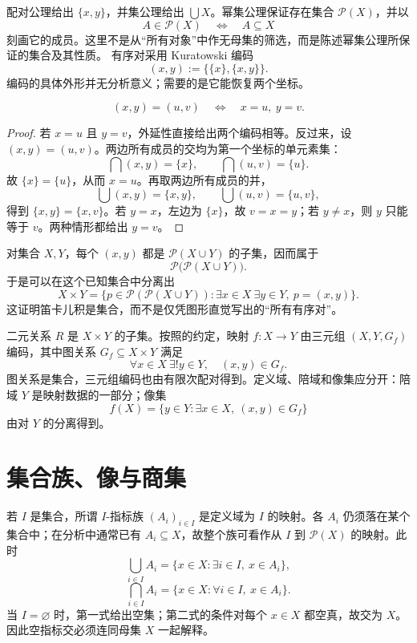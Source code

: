 配对公理给出 \(\{x,y\}\)，并集公理给出 \(\bigcup X\)。幂集公理保证存在集合 \(\mathcal P(X)\)，并以
\[
 A\in\mathcal P(X)\quad\Longleftrightarrow\quad A\subseteq X
\]
刻画它的成员。这里不是从“所有对象”中作无母集的筛选，而是陈述幂集公理所保证的集合及其性质。
有序对采用 Kuratowski 编码
\[
 (x,y):=\bigl\{\{x\},\{x,y\}\bigr\}.
\]
编码的具体外形并无分析意义；需要的是它能恢复两个坐标。

\begin{theorem}[有序对的坐标唯一性]
\[
 (x,y)=(u,v)\quad\Longleftrightarrow\quad x=u,\ y=v.
\]
\end{theorem}

\begin{proof}
若 \(x=u\) 且 \(y=v\)，外延性直接给出两个编码相等。反过来，设 \((x,y)=(u,v)\)。两边所有成员的交均为第一个坐标的单元素集：
\[
 \bigcap(x,y)=\{x\},\qquad \bigcap(u,v)=\{u\}.
\]
故 \(\{x\}=\{u\}\)，从而 \(x=u\)。再取两边所有成员的并，
\[
 \bigcup(x,y)=\{x,y\},\qquad
 \bigcup(u,v)=\{u,v\},
\]
得到 \(\{x,y\}=\{x,v\}\)。若 \(y=x\)，左边为 \(\{x\}\)，故 \(v=x=y\)；若 \(y\ne x\)，则 \(y\) 只能等于 \(v\)。两种情形都给出 \(y=v\)。
\end{proof}

对集合 \(X,Y\)，每个 \((x,y)\) 都是 \(\mathcal P(X\cup Y)\) 的子集，因而属于
\[
 \mathcal P\bigl(\mathcal P(X\cup Y)\bigr).
\]
于是可以在这个已知集合中分离出
\[
 X\times Y
 =
 \{p\in\mathcal P(\mathcal P(X\cup Y)):
   \exists x\in X\ \exists y\in Y,\ p=(x,y)\}.
\]
这证明笛卡儿积是集合，而不是仅凭图形直觉写出的“所有有序对”。

二元关系 \(R\) 是 \(X\times Y\) 的子集。按照的约定，映射 \(f:X\to Y\) 由三元组 \((X,Y,G_f)\) 编码，其中图关系 \(G_f\subseteq X\times Y\) 满足
\[
 \forall x\in X\ \exists!y\in Y,\quad (x,y)\in G_f.
\]
图关系是集合，三元组编码也由有限次配对得到。定义域、陪域和像集应分开：陪域 \(Y\) 是映射数据的一部分；像集
\[
 f(X)=\{y\in Y:\exists x\in X,\ (x,y)\in G_f\}
\]
由对 \(Y\) 的分离得到。

\section{集合族、像与商集}

若 \(I\) 是集合，所谓 \(I\)-指标族 \((A_i)_{i\in I}\) 是定义域为 \(I\) 的映射。各 \(A_i\) 仍须落在某个集合中；在分析中通常已有 \(A_i\subseteq X\)，故整个族可看作从 \(I\) 到 \(\mathcal P(X)\) 的映射。此时
\[
 \bigcup_{i\in I}A_i
 =\{x\in X:\exists i\in I,\ x\in A_i\},
\]
\[
 \bigcap_{i\in I}A_i
 =\{x\in X:\forall i\in I,\ x\in A_i\}.
\]
当 \(I=\varnothing\) 时，第一式给出空集；第二式的条件对每个 \(x\in X\) 都空真，故交为 \(X\)。因此空指标交必须连同母集 \(X\) 一起解释。

